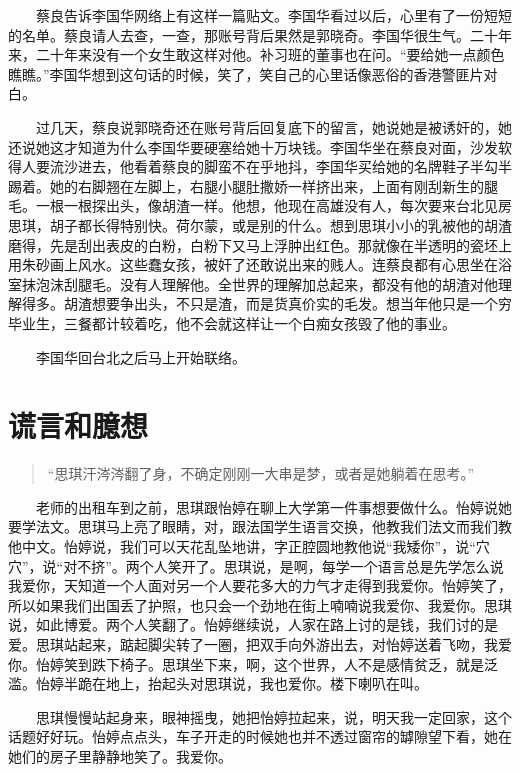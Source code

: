 \documentclass[12pt,UTF8]{ctexbook}
\begin{document}
　　蔡良告诉李国华网络上有这样一篇贴文。李国华看过以后，心里有了一份短短的名单。蔡良请人去查，一查，那账号背后果然是郭晓奇。李国华很生气。二十年来，二十年来没有一个女生敢这样对他。补习班的董事也在问。\enquote{要给她一点颜色瞧瞧。}李国华想到这句话的时候，笑了，笑自己的心里话像恶俗的香港警匪片对白。

　　过几天，蔡良说郭晓奇还在账号背后回复底下的留言，她说她是被诱奸的，她还说她这才知道为什么李国华要硬塞给她十万块钱。李国华坐在蔡良对面，沙发软得人要流沙进去，他看着蔡良的脚蛮不在乎地抖，李国华买给她的名牌鞋子半勾半踢着。她的右脚翘在左脚上，右腿小腿肚撒娇一样挤出来，上面有刚刮新生的腿毛。一根一根探出头，像胡渣一样。他想，他现在高雄没有人，每次要来台北见房思琪，胡子都长得特别快。荷尔蒙，或是别的什么。想到思琪小小的乳被他的胡渣磨得，先是刮出表皮的白粉，白粉下又马上浮肿出红色。那就像在半透明的瓷坯上用朱砂画上风水。这些蠢女孩，被奸了还敢说出来的贱人。连蔡良都有心思坐在浴室抹泡沫刮腿毛。没有人理解他。全世界的理解加总起来，都没有他的胡渣对他理解得多。胡渣想要争出头，不只是渣，而是货真价实的毛发。想当年他只是一个穷毕业生，三餐都计较着吃，他不会就这样让一个白痴女孩毁了他的事业。

　　李国华回台北之后马上开始联络。

\hypertarget{ux8c0eux8a00ux548cux81c6ux60f3}{%
\section*{谎言和臆想}\label{ux8c0eux8a00ux548cux81c6ux60f3}}

\begin{quote}
\enquote{思琪汗涔涔翻了身，不确定刚刚一大串是梦，或者是她躺着在思考。}
\end{quote}

　　老师的出租车到之前，思琪跟怡婷在聊上大学第一件事想要做什么。怡婷说她要学法文。思琪马上亮了眼睛，对，跟法国学生语言交换，他教我们法文而我们教他中文。怡婷说，我们可以天花乱坠地讲，字正腔圆地教他说\enquote{我矮你}，说\enquote{穴穴}，说\enquote{对不挤}。两个人笑开了。思琪说，是啊，每学一个语言总是先学怎么说我爱你，天知道一个人面对另一个人要花多大的力气才走得到我爱你。怡婷笑了，所以如果我们出国丢了护照，也只会一个劲地在街上喃喃说我爱你、我爱你。思琪说，如此博爱。两个人笑翻了。怡婷继续说，人家在路上讨的是钱，我们讨的是爱。思琪站起来，踮起脚尖转了一圈，把双手向外游出去，对怡婷送着飞吻，我爱你。怡婷笑到跌下椅子。思琪坐下来，啊，这个世界，人不是感情贫乏，就是泛滥。怡婷半跪在地上，抬起头对思琪说，我也爱你。楼下喇叭在叫。

　　思琪慢慢站起身来，眼神摇曳，她把怡婷拉起来，说，明天我一定回家，这个话题好好玩。怡婷点点头，车子开走的时候她也并不透过窗帘的罅隙望下看，她在她们的房子里静静地笑了。我爱你。
\end{document}
